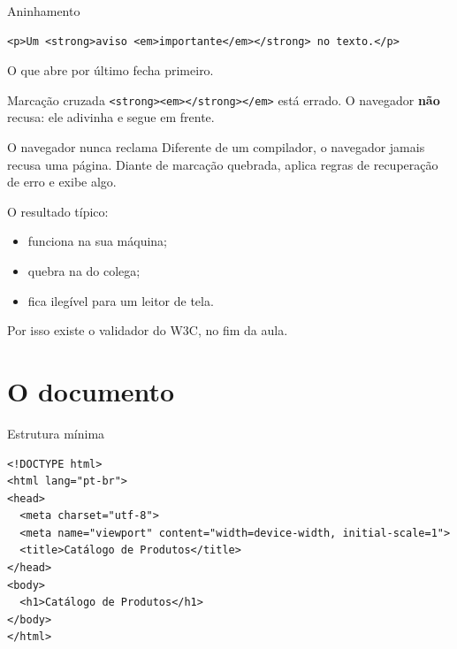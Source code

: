 \documentclass{beamer}
\begin{document}
\begin{frame}[fragile]{Aninhamento}
  \begin{verbatim}
<p>Um <strong>aviso <em>importante</em></strong> no texto.</p>
  \end{verbatim}

  \vspace{0.3cm}
  O que abre por último fecha primeiro.

  \vspace{0.5cm}
  \begin{alertblock}{Marcação cruzada}
    \texttt{<strong><em></strong></em>} está errado. O navegador
    \textbf{não} recusa: ele adivinha e segue em frente.
  \end{alertblock}
\end{frame}

\begin{frame}{O navegador nunca reclama}
  Diferente de um compilador, o navegador jamais recusa uma página. Diante de
  marcação quebrada, aplica regras de recuperação de erro e exibe algo.

  \vspace{0.5cm}
  O resultado típico:
  \begin{itemize}
    \item funciona na sua máquina;
    \item quebra na do colega;
    \item fica ilegível para um leitor de tela.
  \end{itemize}

  \vspace{0.4cm}
  Por isso existe o validador do W3C, no fim da aula.
\end{frame}

\section{O documento}

\begin{frame}[fragile]{Estrutura mínima}
  \begin{verbatim}
<!DOCTYPE html>
<html lang="pt-br">
<head>
  <meta charset="utf-8">
  <meta name="viewport" content="width=device-width, initial-scale=1">
  <title>Catálogo de Produtos</title>
</head>
<body>
  <h1>Catálogo de Produtos</h1>
</body>
</html>
  \end{verbatim}
\end{frame}
\end{document}
